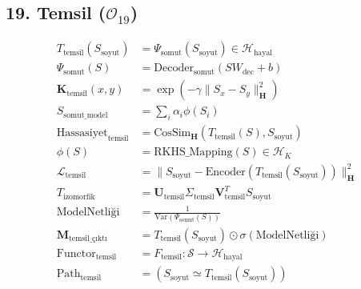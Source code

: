 \documentclass[11pt, a4paper]{article}
\begin{document}
\subsection{19. Temsil ($\mathcal{O}_{19}$)}
\begin{align}
T_{\text{temsil}}(S_{\text{soyut}}) &= \Psi_{\text{somut}}(S_{\text{soyut}}) \in \mathcal{H}_{\text{hayal}} \\
\Psi_{\text{somut}}(S) &= \text{Decoder}_{\text{somut}}(S W_{\text{dec}} + b) \\
\mathbf{K}_{\text{temsil}}(x, y) &= \exp\left( -\gamma \|S_x - S_y\|_{\mathbf{H}}^2 \right) \\
S_{\text{somut\_model}} &= \sum_i \alpha_i \phi(S_i) \\
\text{Hassasiyet}_{\text{temsil}} &= \text{CosSim}_{\mathbf{H}}\left(T_{\text{temsil}}(S), S_{\text{soyut}}\right) \\
\phi(S) &= \text{RKHS\_Mapping}(S) \in \mathcal{H}_K \\
\mathcal{L}_{\text{temsil}} &= \| S_{\text{soyut}} - \text{Encoder}(T_{\text{temsil}}(S_{\text{soyut}})) \|_{\mathbf{H}}^2 \\
T_{\text{izomorfik}} &= \mathbf{U}_{\text{temsil}} \Sigma_{\text{temsil}} \mathbf{V}_{\text{temsil}}^T S_{\text{soyut}} \\
\text{ModelNetliği} &= \frac{1}{\text{Var}(\Psi_{\text{somut}}(S))} \\
\mathbf{M}_{\text{temsil\_çıktı}} &= T_{\text{temsil}}(S_{\text{soyut}}) \odot \sigma(\text{ModelNetliği}) \\
\text{Functor}_{\text{temsil}} &= F_{\text{temsil}} : \mathcal{S} \to \mathcal{H}_{\text{hayal}} \\
\text{Path}_{\text{temsil}} &= (S_{\text{soyut}} \simeq T_{\text{temsil}}(S_{\text{soyut}}))
\end{align}
\end{document}

